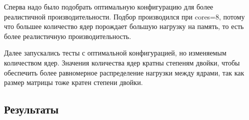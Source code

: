 \documentclass[a4paper]{article}
\begin{document}

Сперва надо было подобрать оптимальную конфигурацию для более реалистичной производительности. Подбор производился при cores=8, потому что большее количество ядер порождает большую нагрузку на память, то есть более реалистичную производительность.

Далее запускались тесты с оптимальной конфигурацией, но изменяемым количеством ядер. Значения количества ядер кратны степеням двойки, чтобы обеспечить более равномерное распределение нагрузки между ядрами, так как размер матрицы тоже кратен степени двойки.

\subsection{Результаты}
\end{document}
